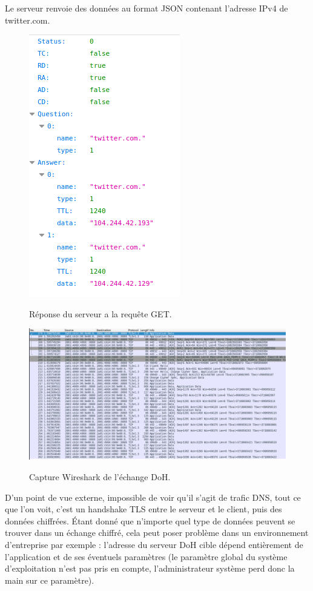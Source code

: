 \documentclass[a4paper,12pt]{article}
\begin{document}
	Le serveur renvoie des données au format JSON contenant l'adresse IPv4 de twitter.com.
	
	\begin{figure}[H]
		\begin{center}
			{\includegraphics[scale=0.6]{Images/out_json.png}}
		\end{center}
		\caption{Réponse du serveur a la requête GET.}
	\end{figure}
	
	
 	\begin{figure}[H]
	 	\begin{center}
	 		{\includegraphics[scale=0.55]{Images/doh-wireshark.png}}
	 	\end{center}
	 	\caption{Capture Wireshark de l'échange DoH.}
	\end{figure}

	\label{sec:res_etr}D'un point de vue externe, impossible de voir qu'il s'agit de trafic DNS, tout ce que l'on voit, c'est un handshake TLS entre le serveur et le client, puis des données chiffrées. Étant donné que n'importe quel type de données peuvent se trouver dans un échange chiffré, cela peut poser problème dans un environnement d'entreprise par exemple : l'adresse du serveur DoH cible dépend entièrement de l'application et de ses éventuels paramètres (le paramètre global du système d'exploitation n'est pas pris en compte, l'administrateur système perd donc la main sur ce paramètre). 
	
\end{document}
